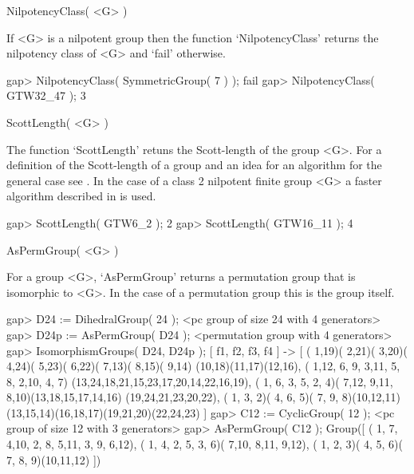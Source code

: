\>NilpotencyClass( <G> )

If <G> is a nilpotent group then the function `NilpotencyClass' returns the 
nilpotency class of <G> and `fail' otherwise.

\beginexample
    gap> NilpotencyClass( SymmetricGroup( 7 ) );
    fail
    gap> NilpotencyClass( GTW32_47 );
    3
\endexample



\>ScottLength( <G> )

The function `ScottLength' retuns the Scott-length of the group <G>.
For a definition of the Scott-length of a group and an idea for an
algorithm for the general case see \cite{scott69:TAOPMOAGATSOCPPGI}.
In the case of a class 2 nilpotent finite group <G> a faster algorithm
described in \cite{ecker98:OTNOPFONGOC2} is used.

\beginexample
    gap> ScottLength( GTW6_2 );    
    2
    gap> ScottLength( GTW16_11 );
    4
\endexample



\>AsPermGroup( <G> )

For a group <G>, `AsPermGroup' returns a permutation group that is isomorphic
to <G>. In the case of a permutation group this is the group itself.

\beginexample
    gap> D24 := DihedralGroup( 24 );
    <pc group of size 24 with 4 generators>
    gap> D24p := AsPermGroup( D24 );
    <permutation group with 4 generators>
    gap> IsomorphismGroups( D24, D24p );
    [ f1, f2, f3, f4 ] -> 
    [ ( 1,19)( 2,21)( 3,20)( 4,24)( 5,23)( 6,22)( 7,13)( 8,15)( 9,14)
        (10,18)(11,17)(12,16), ( 1,12, 6, 9, 3,11, 5, 8, 2,10, 4, 7)
        (13,24,18,21,15,23,17,20,14,22,16,19), 
      ( 1, 6, 3, 5, 2, 4)( 7,12, 9,11, 8,10)(13,18,15,17,14,16)
        (19,24,21,23,20,22), ( 1, 3, 2)( 4, 6, 5)( 7, 9, 8)(10,12,11)
        (13,15,14)(16,18,17)(19,21,20)(22,24,23) ]
    gap> C12 := CyclicGroup( 12 );  
    <pc group of size 12 with 3 generators>
    gap> AsPermGroup( C12 );
    Group([ ( 1, 7, 4,10, 2, 8, 5,11, 3, 9, 6,12), 
      ( 1, 4, 2, 5, 3, 6)( 7,10, 8,11, 9,12), 
      ( 1, 2, 3)( 4, 5, 6)( 7, 8, 9)(10,11,12) ])
\endexample




















